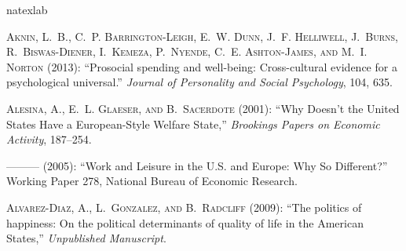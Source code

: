 \documentclass[10pt, letterpaper]{article}
\begin{document}
\begin{spacing}{1.4}




%
\begin{thebibliography}{91}
\newcommand{\enquote}[1]{``#1''}
\expandafter\ifx\csname natexlab\endcsname\relax\def\natexlab#1{#1}\fi

\textsc{Aknin, L.~B., C.~P. Barrington-Leigh, E.~W. Dunn, J.~F. Helliwell,
  J.~Burns, R.~Biswas-Diener, I.~Kemeza, P.~Nyende, C.~E. Ashton-James, and
  M.~I. Norton} (2013): \enquote{Prosocial spending and well-being:
  Cross-cultural evidence for a psychological universal.} \emph{Journal of
  Personality and Social Psychology}, 104, 635.

\textsc{Alesina, A., E.~L. Glaeser, and B.~Sacerdote} (2001): \enquote{Why
  Doesn't the United States Have a European-Style Welfare State,}
  \emph{Brookings Papers on Economic Activity}, 187--254.

---\hspace{-.1pt}---\hspace{-.1pt}--- (2005): \enquote{Work and Leisure in the
  U.S. and Europe: Why So Different?} Working Paper 278, National Bureau of
  Economic Research.

\textsc{Alvarez-Diaz, A., L.~Gonzalez, and B.~Radcliff} (2009): \enquote{{The
  politics of happiness: On the political determinants of quality of life in
  the American States},} \emph{Unpublished Manuscript}.


\end{thebibliography}
\end{spacing}
\end{document}
